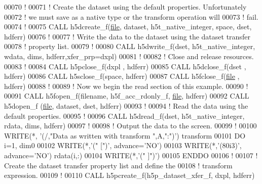 \begin{DoxyCode}
00070   \textcolor{comment}{!}
00071   \textcolor{comment}{! Create the dataset using the default properties.  Unfortunately}
00072   \textcolor{comment}{! we must save as a native type or the transform operation will}
00073   \textcolor{comment}{! fail.}
00074   \textcolor{comment}{!}
00075   \textcolor{keyword}{CALL }h5dcreate\_f(\hyperlink{structfile}{file}, dataset, h5t\_native\_integer, space, dset, hdferr)
00076   \textcolor{comment}{!}
00077   \textcolor{comment}{! Write the data to the dataset using the dataset transfer}
00078   \textcolor{comment}{! property list.}
00079   \textcolor{comment}{!}
00080   \textcolor{keyword}{CALL }h5dwrite\_f(dset, h5t\_native\_integer, wdata, dims, hdferr,xfer\_prp=dxpl)
00081   \textcolor{comment}{!}
00082   \textcolor{comment}{! Close and release resources.}
00083   \textcolor{comment}{!}
00084   \textcolor{keyword}{CALL }h5pclose\_f(dxpl , hdferr)
00085   \textcolor{keyword}{CALL }h5dclose\_f(dset , hdferr)
00086   \textcolor{keyword}{CALL }h5sclose\_f(space, hdferr)
00087   \textcolor{keyword}{CALL }h5fclose\_f(\hyperlink{structfile}{file} , hdferr)
00088   \textcolor{comment}{!}
00089   \textcolor{comment}{! Now we begin the read section of this example.}
00090   \textcolor{comment}{!}
00091   \textcolor{keyword}{CALL }h5fopen\_f(filename, h5f\_acc\_rdonly\_f, \hyperlink{structfile}{file}, hdferr)
00092   \textcolor{keyword}{CALL }h5dopen\_f (\hyperlink{structfile}{file}, dataset, dset, hdferr)
00093   \textcolor{comment}{!}
00094   \textcolor{comment}{! Read the data using the default properties.}
00095   \textcolor{comment}{!}
00096   \textcolor{keyword}{CALL }h5dread\_f(dset, h5t\_native\_integer, rdata, dims, hdferr)
00097   \textcolor{comment}{!}
00098   \textcolor{comment}{! Output the data to the screen.}
00099   \textcolor{comment}{!}
00100   \textcolor{keyword}{WRITE}(*, \textcolor{stringliteral}{'(/,"Data as written with transform ",A,":")'}) transform
00101   \textcolor{keywordflow}{DO} i=1, dim0
00102      \textcolor{keyword}{WRITE}(*,\textcolor{stringliteral}{'(" [")'}, advance=\textcolor{stringliteral}{'NO'})
00103      \textcolor{keyword}{WRITE}(*,\textcolor{stringliteral}{'(80i3)'}, advance=\textcolor{stringliteral}{'NO'}) rdata(i,:)
00104      \textcolor{keyword}{WRITE}(*,\textcolor{stringliteral}{'(" ]")'})
00105 \textcolor{keywordflow}{  ENDDO}
00106   \textcolor{comment}{!}
00107   \textcolor{comment}{! Create the dataset transfer property list and define the}
00108   \textcolor{comment}{! transform expression.}
00109   \textcolor{comment}{!}
00110   \textcolor{keyword}{CALL }h5pcreate\_f(h5p\_dataset\_xfer\_f, dxpl, hdferr)

\end{DoxyCode}

